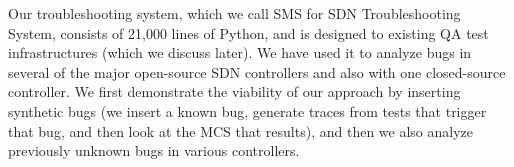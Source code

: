 Our troubleshooting system, which we call SMS for SDN Troubleshooting System, consists of 21,000 lines of Python, and is designed to existing QA test infrastructures (which we discuss later). We have used it to analyze bugs in several of the major open-source SDN controllers and also with one closed-source controller. We first demonstrate the viability of our approach by inserting synthetic bugs (\ie we insert a known bug, generate traces from tests that trigger that bug, and then look at the MCS that results), and then we also analyze previously unknown bugs in various controllers.

